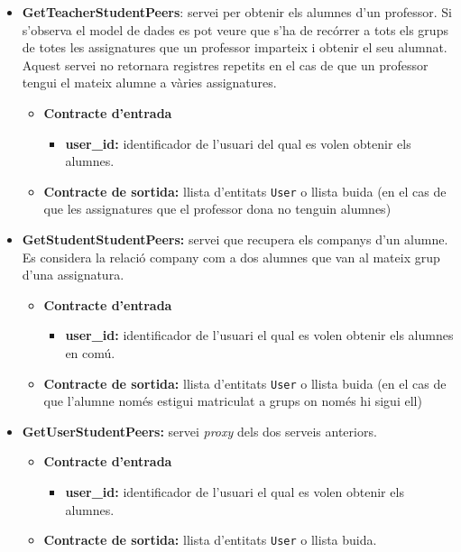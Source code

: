 \begin{itemize}
			\item \textbf{GetTeacherStudentPeers}: servei per obtenir els alumnes d'un professor. Si s'observa el model de dades es pot veure que s'ha de recórrer a tots els grups de totes les assignatures que un professor imparteix i obtenir el seu alumnat. Aquest servei no retornara registres repetits en el cas de que un professor tengui el mateix alumne a vàries assignatures.
				\begin{itemize}
					\item \textbf{Contracte d'entrada}
						\begin{itemize}
							\item \textbf{user\_id:} identificador de l'usuari del qual es volen obtenir els alumnes.
						\end{itemize}
					\item \textbf{Contracte de sortida:} llista d'entitats \texttt{User} o llista buida (en el cas de que les assignatures que el professor dona no tenguin alumnes)
				\end{itemize}
			
			\item \textbf{GetStudentStudentPeers:} servei que recupera els companys d'un alumne. Es considera la relació company com a dos alumnes que van al mateix grup d'una assignatura.
			
				\begin{itemize}
					\item \textbf{Contracte d'entrada}
						\begin{itemize}
							\item \textbf{user\_id:} identificador de l'usuari el qual es volen obtenir els alumnes en comú.
						\end{itemize}
					\item \textbf{Contracte de sortida:} llista d'entitats \texttt{User} o llista buida (en el cas de que l'alumne només estigui matriculat a grups on només hi sigui ell)
				\end{itemize}
				
			\item \textbf{GetUserStudentPeers:} servei \emph{proxy} dels dos serveis anteriors.
			
				\begin{itemize}
					\item \textbf{Contracte d'entrada}
						\begin{itemize}
							\item \textbf{user\_id:} identificador de l'usuari el qual es volen obtenir els alumnes.
						\end{itemize}
					\item \textbf{Contracte de sortida:} llista d'entitats \texttt{User} o llista buida.
				\end{itemize}
				

\end{itemize}
